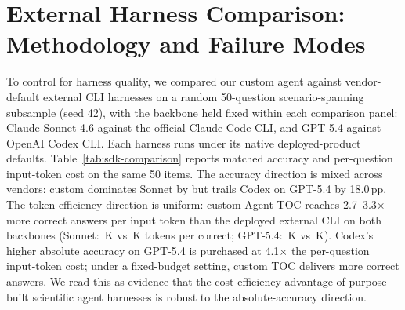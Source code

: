 \documentclass{article}
\begin{document}
\section{External Harness Comparison: Methodology and Failure Modes}
\label{sec:appendix-external-harness}

To control for harness quality, we compared our custom agent against vendor-default external CLI harnesses on a random 50-question scenario-spanning subsample (seed 42), with the backbone held fixed within each comparison panel: Claude Sonnet 4.6 against the official Claude Code CLI, and GPT-5.4 against OpenAI Codex CLI. Each harness runs under its native deployed-product defaults. Table~\ref{tab:sdk-comparison} reports matched accuracy and per-question input-token cost on the same 50 items. The accuracy direction is mixed across vendors: custom dominates Sonnet by \SDKCustomTOCMinusSDK{} but trails Codex on GPT-5.4 by 18.0\,pp. The token-efficiency direction is uniform: custom Agent-TOC reaches 2.7--3.3$\times$ more correct answers per input token than the deployed external CLI on both backbones (Sonnet: \SonnetCustomTOCPerCorrectK\,K vs \SDKSonnetPerCorrectK\,K tokens per correct; GPT-5.4: \GPTFiveFourCustomTOCPerCorrectK\,K vs \CodexGPTFiveFourPerCorrectK\,K). Codex's higher absolute accuracy on GPT-5.4 is purchased at 4.1$\times$ the per-question input-token cost; under a fixed-budget setting, custom TOC delivers more correct answers. We read this as evidence that the cost-efficiency advantage of purpose-built scientific agent harnesses is robust to the absolute-accuracy direction.
\end{document}
